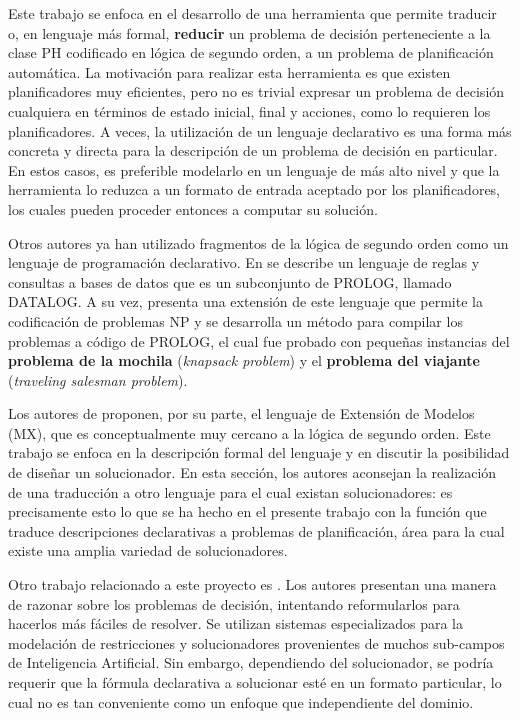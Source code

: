 Este trabajo se enfoca en el desarrollo de una herramienta que permite
traducir o, en lenguaje más formal, \textbf{reducir} un problema de
decisión perteneciente a la clase PH codificado en lógica de segundo orden,
a un problema de planificación automática. 
La motivación para realizar esta herramienta es que
existen planificadores muy eficientes, pero no es trivial
expresar un problema de decisión cualquiera en términos de estado inicial,
final y acciones, como lo requieren los
planificadores. A veces, la utilización de un lenguaje declarativo es una forma
más concreta y directa para la descripción de un problema de decisión en
particular. En estos casos, es preferible modelarlo en un lenguaje de más alto
nivel y que la herramienta lo reduzca a un formato de entrada aceptado por
los planificadores, los cuales pueden proceder entonces a computar su solución.

Otros autores ya han utilizado fragmentos de la lógica de segundo orden como un lenguaje de
programación declarativo. En \cite{reiter:cwa} se describe un
lenguaje de reglas y consultas a bases de datos que es un subconjunto de
PROLOG, llamado DATALOG. A su vez, \cite{cadoli:npspec} presenta una
extensión de este lenguaje que permite la codificación de problemas NP y
se desarrolla un método para compilar los problemas a código de PROLOG, el cual
fue probado con pequeñas instancias del \textbf{problema de la mochila}
(\textit{knapsack problem}) y el \textbf{problema del viajante}
(\textit{traveling salesman problem}).

Los autores de \cite{mitchell:npsearch} proponen, por su parte, el lenguaje de
Extensión de Modelos (MX), que es conceptualmente muy cercano a la lógica de
segundo orden. Este trabajo se enfoca en la descripción formal del lenguaje y
en discutir la posibilidad de diseñar un solucionador. En esta sección, los
autores aconsejan la realización de una traducción a otro lenguaje para el cual
existan solucionadores: es precisamente esto lo que se ha hecho en el presente
trabajo con la función que traduce descripciones declarativas a problemas
de planificación, área para la cual existe una amplia variedad de solucionadores.

Otro trabajo relacionado a este proyecto es \cite{cadoli:safedelay}. Los
autores presentan una manera de razonar sobre los problemas de
decisión, intentando reformularlos para hacerlos más fáciles de resolver. Se
utilizan sistemas especializados para la modelación de restricciones y
solucionadores provenientes de muchos sub-campos de Inteligencia Artificial.
Sin embargo, dependiendo del solucionador, se podría requerir que la fórmula
declarativa a solucionar esté en un formato particular, lo cual no es tan
conveniente como un enfoque que independiente del dominio.

